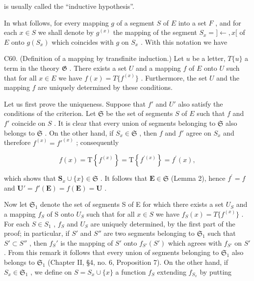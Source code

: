 is usually called the ``inductive hypothesis''.

In what follows, for every mapping \(g\) of a segment \(S\) of \(E\) into a set \(F\) , and for each \(x \in S\) we shall denote by \(g^{(x)}\) the mapping of the segment \(S_x = ] \leftarrow, x[\) of \(E\) onto \(g(S_x)\) which coincides with \(g\) on \(S_x\) . With this notation we have

C60. (Definition of a mapping by transfinite induction.) Let \(u\) be a letter, \(T\{u\}\) a term in the theory \(\mathfrak{G}\) . There exists a set \(U\) and a mapping \(f\) of \(E\) onto \(U\) such that for all \(x \in E\) we have \(f(x) = T\{f^{(x)}\}\) . Furthermore, the set \(U\) and the mapping \(f\) are uniquely determined by these conditions.

Let us first prove the uniqueness. Suppose that \(f'\) and \(U'\) also satisfy the conditions of the criterion. Let \(\mathfrak{S}\) be the set of segments \(S\) of \(E\) such that \(f\) and \(f'\) coincide on \(S\) . It is clear that every union of segments belonging to \(\mathfrak{S}\) also belongs to \(\mathfrak{S}\) . On the other hand, if \(S_x \in \mathfrak{S}\) , then \(f\) and \(f'\) agree on \(S_x\) and therefore \(f^{(x)} = f'^{(x)}\) ; consequently

\[
f (x) = \mathrm{T} \left\{f ^ {(x)} \right\} = \mathrm{T} \left\{f ^ {\prime (x)} \right\} = f ^ {\prime} (x),
\]

which shows that \(\mathbf{S}_x\cup \{x\} \in \mathfrak{S}\) . It follows that \(\mathbf{E}\in \mathfrak{S}\) (Lemma 2), hence \(f^{\prime} = f\) and \(\mathbf{U}' = f'(\mathbf{E}) = f(\mathbf{E}) = \mathbf{U}\) .

Now let \(\mathfrak{S}_1\) denote the set of segments S of E for which there exists a set \(U_S\) and a mapping \(f_S\) of S onto \(U_S\) such that for all \(x \in S\) we have \(f_S(x) = T \{ f^{(x)} \}\) . For each \(S \in S_1\) , \(f_S\) and \(U_S\) are uniquely determined, by the first part of the proof; in particular, if \(S'\) and \(S''\) are two segments belonging to \(\mathfrak{S}_1\) such that \(S' \subset S''\) , then \(f_S'\) is the mapping of \(S'\) onto \(f_{S'}(S')\) which agrees with \(f_{S'}\) on \(S'\) . From this remark it follows that every union of segments belonging to \(\mathfrak{S}_1\) also belongs to \(\mathfrak{S}_1\) (Chapter II, §4, no. 6, Proposition 7). On the other hand, if \(S_x \in \mathfrak{S}_1\) , we define on \(S = S_x \cup \{x\}\) a function \(f_S\) extending \(f_{S_x}\) by putting


